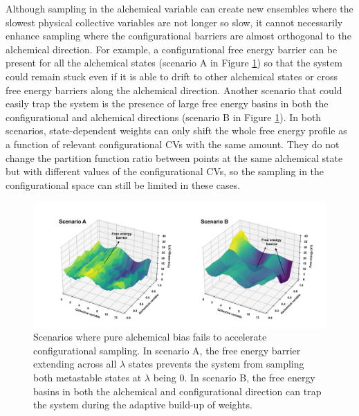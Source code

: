 \documentclass[journal=jacsat,manuscript=article]{achemso}
\begin{document}
Although sampling in the alchemical variable can create new ensembles where the slowest physical collective variables are not longer so slow, it cannot necessarily enhance sampling where the configurational barriers are almost orthogonal to the alchemical direction. For example, a configurational free energy barrier can be present for all the alchemical states (scenario A in Figure \ref{EXE_issues}) so that the system could remain stuck even if it is able to drift to other alchemical states or cross free energy barriers along the alchemical direction. Another scenario that could easily trap the system is the presence of large free energy basins in both the configurational and alchemical directions (scenario B in Figure \ref{EXE_issues}). In both scenarios, state-dependent weights can only shift the whole free energy profile as a function of relevant configurational CVs with the same amount. They do not change the partition function ratio between points at the same alchemical state but with different values of the configurational CVs, so the sampling in the configurational space can still be limited in these cases.

\begin{figure}[ht]
    \centering
    \includegraphics[width=\textwidth]{Figures/EXE_issues_final.png}   
    \caption{Scenarios where pure alchemical bias fails to accelerate configurational sampling. In scenario A, the free energy barrier extending across all $\lambda$ states prevents the system from sampling both metastable states at $\lambda$ being 0. In scenario B, the free energy basins in both the alchemical and configurational direction can trap the system during the adaptive build-up of weights.}
    \label{EXE_issues}
\end{figure}
\end{document}
